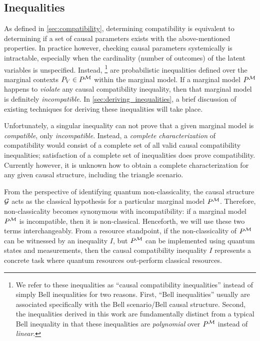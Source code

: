 \documentclass[aps, 10pt, english, twoside, pra, nofootinbib, tightenlines, longbibliography]{revtex4-1}
\begin{document}
    \subsection{Inequalities}
    As defined in \cref{sec:compatibility}, determining compatibility is equivalent to determining if a set of causal parameters exists with the above-mentioned properties. In practice however, checking causal parameters systemically is intractable, especially when the cardinality (number of outcomes) of the latent variables is unspecified. Instead, \footnote{We refer to these inequalities as ``causal compatibility inequalities'' instead of simply Bell inequalities for two reasons. First, ``Bell inequalities'' usually are associated specifically with the Bell scenario/Bell causal structure. Second, the inequalities derived in this work are fundamentally distinct from a typical Bell inequality in that these inequalities are \textit{polynomial} over $\prob^{\mscenario}$ instead of \textit{linear}.} are probabilistic inequalities defined over the marginal contexts $\prob[V] \in \prob^{\mscenario}$ within the marginal model. If a marginal model $\prob^{\mscenario}$ happens to \textit{violate} any causal compatibility inequality, then that marginal model is definitely \textit{incompatible}. In \cref{sec:deriving_inequalities}, a brief discussion of existing techniques for deriving these inequalities will take place.

    Unfortunately, a singular inequality can not prove that a given marginal model is \textit{compatible}, only \textit{incompatible}. Instead, a \textit{complete characterization} of compatibility would consist of a complete set of all valid causal compatibility inequalities; satisfaction of a complete set of inequalities does prove compatibility. Currently however, it is unknown how to obtain a complete characterization for any given causal structure, including the triangle scenario.

    From the perspective of identifying quantum non-classicality, the causal structure $\mathcal{G}$ acts as the classical hypothesis for a particular marginal model $\prob^{\mscenario}$. Therefore, non-classicality becomes synonymous with incompatibility: if a marginal model $\prob^{\mscenario}$ is incompatible, then it is non-classical. Henceforth, we will use these two terms interchangeably. From a resource standpoint, if the non-classicality of $\prob^{\mscenario}$ can be witnessed by an inequality $I$, but $\prob^{\mscenario}$ can be implemented using quantum states and measurements, then the causal compatibility inequality $I$ represents a concrete task where quantum resources out-perform classical resources.
\end{document}
